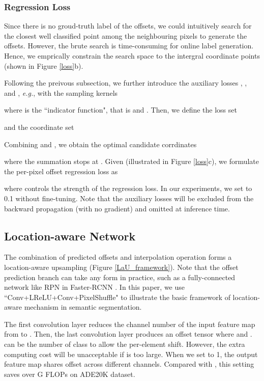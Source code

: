 \documentclass[10pt,twocolumn,letterpaper]{article}
\begin{document}
\subsubsection{Regression Loss}
Since there is no groud-truth label of the offsets, we could intuitively search for the closest well classified point among the neighbouring  pixels to generate the offsets. However, the brute search is time-consuming for online label generation. Hence, we emprically constrain the search space to the intergral coordinate points (shown in Figure \ref{loss}b). 

Following the preivous subsection, we further introduce the auxiliary losses ,  ,  and , \textit{e.g.},  with the sampling kernels

where  is the ``indicator function", that is  and . Then, we define the loss set

and the coordinate set

Combining  and , we obtain the optimal candidate corrdinates

where the summation stops at . Given  (illustrated in Figure \ref{loss}c), we formulate the per-pixel offset regression loss as

where  controls the strength of the regression loss. In our experiments, we set  to 0.1 without fine-tuning. Note that the auxiliary losses will be excluded from the backward propagation (with no gradient) and omitted at inference time. 

\subsection{Location-aware Network}
The combination of predicted offsets and interpolation operation forms a location-aware upsampling (Figure \ref{LaU_framework}). Note that the offset prediction branch can take any form in practice, such as a fully-connected network like RPN in Faster-RCNN \cite{RenHGS15}. In this paper, we use ``Conv+LReLU+Conv+PixelShuffle" to illustrate the basic framework of location-aware mechanism in semantic segmentation. 

The first  convolution layer reduces the channel number of the input feature map  from  to . Then, the last convolution layer produces an offset tensor  where  and .  can be the number of class to allow the per-element shift. However, the extra computing cost will be unacceptable if  is too large. When we set  to 1, the output feature map shares offset across different channels. Compared with , this setting saves over G FLOPs on ADE20K dataset.
\end{document}
